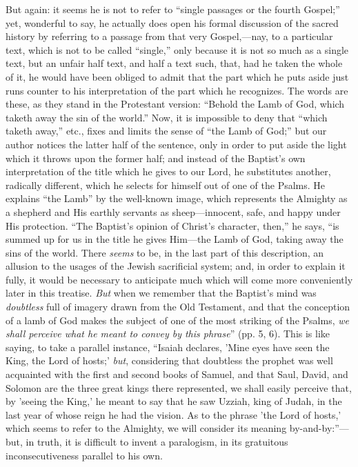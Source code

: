 But again: it seems he is not to refer to ``single
passages or the fourth Gospel;'' yet, wonderful to say, he actually
does open his formal discussion of the sacred history by referring to
a passage from that very Gospel,—nay, to a particular text, which is
not to be called ``single,'' only because it is not so much as a
single text, but an unfair half text, and half a text such, that, had
he taken the whole of it, he would have been obliged to admit that the
part which he puts aside just runs counter to his interpretation
of the part which he recognizes. The words are these, as they stand in
the Protestant version: ``Behold the Lamb of God, which taketh away the
sin of the world.'' Now, it is impossible to deny that ``which taketh
away,'' etc., fixes and limits the sense of ``the Lamb of God;'' but our
author notices the latter half of the sentence, only in order to put
aside the light which it throws upon the former half; and instead of
the Baptist's own interpretation of the title which he gives to our
Lord, he substitutes another, radically different, which he selects
for himself out of one of the Psalms. He explains ``the Lamb'' by the
well-known image, which represents the Almighty as a shepherd and His
earthly servants as sheep—innocent, safe, and happy under His
protection. ``The Baptist's opinion of Christ's character, then,'' he
says, ``is summed up for us in the title he gives Him—the Lamb of
God, taking away the sins of the world. There \emph{seems} to be, in
the last part of this description, an allusion to the usages of the
Jewish sacrificial system; and, in order to explain it fully, it would
be necessary to anticipate much which will come more conveniently
later in this treatise. \emph{But} when we remember that the Baptist's
mind was \emph{doubtless} full of imagery drawn from the Old
Testament, and that the conception of a lamb of God makes the subject
of one of the most striking of the Psalms, \emph{we shall perceive what
he meant to convey by this phrase}'' (pp. 5, 6). This is like
saying, to take a parallel instance, ``Isaiah declares, 'Mine eyes have
seen the King, the Lord of hosts;' \emph{but}, considering that
doubtless the prophet was well acquainted with the first and second
books of Samuel, and that Saul, David, and Solomon are the three great
kings there represented, we shall easily perceive that, by 'seeing the
King,' he meant to say that he saw Uzziah, king of Judah, in the
last year of whose reign he had the vision. As to the phrase 'the Lord
of hosts,' which seems to refer to the Almighty, we will consider its
meaning by-and-by:''—but, in truth, it is difficult to invent a
paralogism, in its gratuitous inconsecutiveness parallel to his own.

